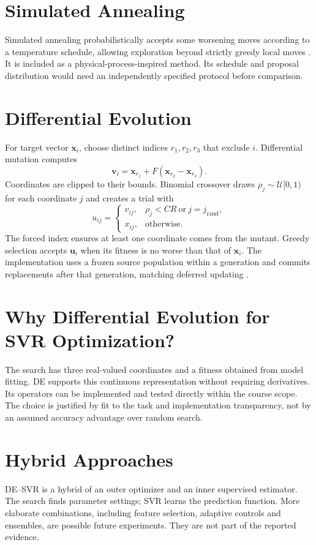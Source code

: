 \section{Simulated Annealing}
Simulated annealing probabilistically accepts some worsening moves according to a temperature schedule, allowing exploration beyond strictly greedy local moves \cite{annealing}. It is included as a physical-process-inspired method. Its schedule and proposal distribution would need an independently specified protocol before comparison.
\section{Differential Evolution}
For target vector $\mathbf{x}_i$, choose distinct indices $r_1,r_2,r_3$ that exclude $i$. Differential mutation computes
\begin{equation}\mathbf{v}_i=\mathbf{x}_{r_1}+F(\mathbf{x}_{r_2}-\mathbf{x}_{r_3}).\end{equation}
Coordinates are clipped to their bounds. Binomial crossover draws $\rho_j\sim\mathcal{U}[0,1)$ for each coordinate $j$ and creates a trial with
\begin{equation}u_{ij}=\begin{cases}v_{ij},&\rho_j<CR\ \text{or}\ j=j_{\mathrm{rand}},\\x_{ij},&\text{otherwise}.\end{cases}\end{equation}
The forced index ensures at least one coordinate comes from the mutant. Greedy selection accepts $\mathbf{u}_i$ when its fitness is no worse than that of $\mathbf{x}_i$. The implementation uses a frozen source population within a generation and commits replacements after that generation, matching deferred updating \cite{storn}.
\section{Why Differential Evolution for SVR Optimization?}
The search has three real-valued coordinates and a fitness obtained from model fitting. DE supports this continuous representation without requiring derivatives. Its operators can be implemented and tested directly within the course scope. The choice is justified by fit to the task and implementation transparency, not by an assumed accuracy advantage over random search.
\section{Hybrid Approaches}
DE--SVR is a hybrid of an outer optimizer and an inner supervised estimator. The search finds parameter settings; SVR learns the prediction function. More elaborate combinations, including feature selection, adaptive controls and ensembles, are possible future experiments. They are not part of the reported evidence.
